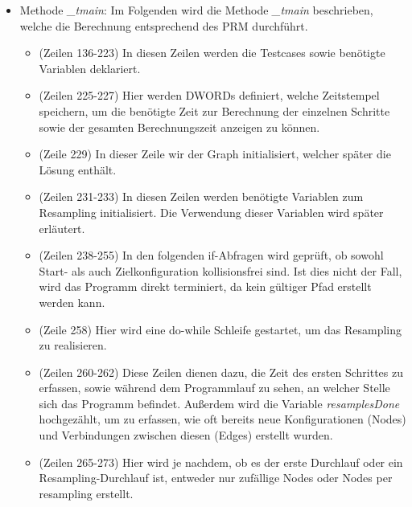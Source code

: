 \documentclass[a4paper]{scrartcl}
\begin{document}
\begin{itemize}
	\item Methode \textit{\_tmain}: Im Folgenden wird die Methode \textit{\_tmain} beschrieben, welche die Berechnung entsprechend des PRM durchführt. 
	
	\begin{itemize}
		\item (Zeilen 136-223) In diesen Zeilen werden die Testcases sowie benötigte Variablen deklariert.
		\item (Zeilen 225-227) Hier werden DWORDs definiert, welche Zeitstempel speichern, um die benötigte Zeit zur Berechnung der einzelnen Schritte sowie der gesamten Berechnungszeit anzeigen zu können.
		\item (Zeile 229) In dieser Zeile wir der Graph initialisiert, welcher später die Lösung enthält.
		\item (Zeilen 231-233) In diesen Zeilen werden benötigte Variablen zum Resampling initialisiert. Die Verwendung dieser Variablen wird später erläutert.
		\item (Zeilen 238-255) In den folgenden if-Abfragen wird geprüft, ob sowohl Start- als auch Zielkonfiguration kollisionsfrei sind. Ist dies nicht der Fall, wird das Programm direkt terminiert, da kein gültiger Pfad erstellt werden kann.
		\item (Zeile 258) Hier wird eine do-while Schleife gestartet, um das Resampling zu realisieren.
		
		\item (Zeilen 260-262) Diese Zeilen dienen dazu, die Zeit des ersten Schrittes zu erfassen, sowie während dem Programmlauf zu sehen, an welcher Stelle sich das Programm befindet. Außerdem wird die Variable \textit{resamplesDone} hochgezählt, um zu erfassen, wie oft bereits neue Konfigurationen (Nodes) und Verbindungen zwischen diesen (Edges) erstellt wurden.
		
		\item (Zeilen 265-273) Hier wird je nachdem, ob es der erste Durchlauf oder ein Resampling-Durchlauf ist, entweder nur zufällige Nodes oder Nodes per resampling erstellt.
		

\end{itemize}
\end{itemize}
\end{document}
